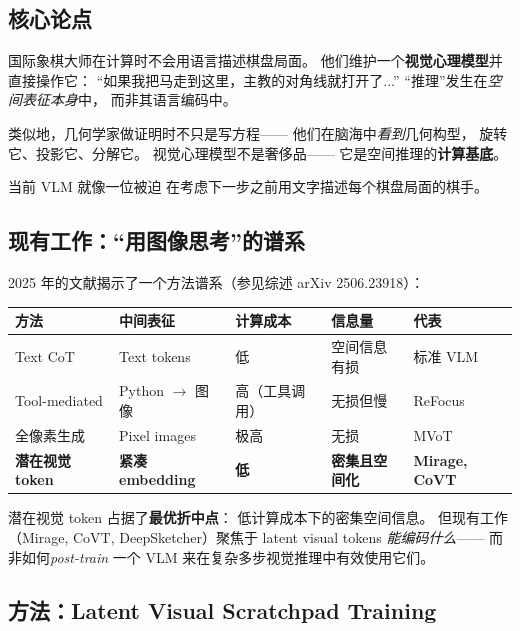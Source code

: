 \documentclass[12pt,a4paper]{article}
\begin{document}
\subsection{核心论点}

\begin{insightbox}
国际象棋大师在计算时不会用语言描述棋盘局面。
他们维护一个\textbf{视觉心理模型}并直接操作它：
``如果我把马走到这里，主教的对角线就打开了...''
``推理''发生在\textit{空间表征本身}中，
而非其语言编码中。

类似地，几何学家做证明时不只是写方程——
他们在脑海中\textit{看到}几何构型，
旋转它、投影它、分解它。
视觉心理模型不是奢侈品——
它是空间推理的\textbf{计算基底}。

当前 VLM 就像一位被迫
在考虑下一步之前用文字描述每个棋盘局面的棋手。
\end{insightbox}

\subsection{现有工作：``用图像思考''的谱系}

2025 年的文献揭示了一个方法谱系（参见综述 arXiv 2506.23918）：

\begin{table}[h]
\centering
\small
\begin{tabular}{p{2.5cm}p{2.8cm}p{2.2cm}p{2.5cm}p{2cm}}
\toprule
\textbf{方法} & \textbf{中间表征} & \textbf{计算成本} & \textbf{信息量} & \textbf{代表} \\
\midrule
Text CoT & Text tokens & 低 & 空间信息有损 & 标准 VLM \\
Tool-mediated & Python $\rightarrow$ 图像 & 高（工具调用） & 无损但慢 & ReFocus \\
全像素生成 & Pixel images & 极高 & 无损 & MVoT \\
\textbf{潜在视觉 token} & \textbf{紧凑 embedding} & \textbf{低} & \textbf{密集且空间化} & \textbf{Mirage, CoVT} \\
\bottomrule
\end{tabular}
\end{table}

\noindent
潜在视觉 token 占据了\textbf{最优折中点}：
低计算成本下的密集空间信息。
但现有工作（Mirage, CoVT, DeepSketcher）聚焦于
latent visual tokens \textit{能编码什么}——
而非如何\textit{post-train} 一个 VLM
来在复杂多步视觉推理中有效使用它们。

\subsection{方法：Latent Visual Scratchpad Training}
\end{document}
